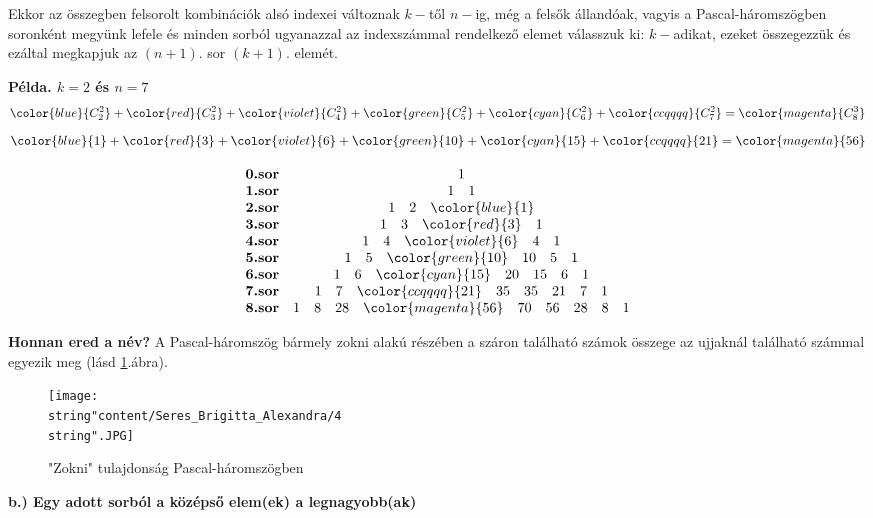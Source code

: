 Ekkor az összegben felsorolt kombinációk alsó indexei változnak $k-$től
$n-$ig, még a felsők \textcolor{ccqqqq}{állandóak}, vagyis a Pascal-háromszögben
soronként megyünk lefele és minden sorból ugyanazzal az indexszámmal
rendelkező elemet válasszuk ki: $k-$adikat, ezeket összegezzük és
ezáltal megkapjuk az $(n+1).$ sor $(k+1).$ elemét.

\textbf{Példa. $k=2$ és $n=7$} 
\[
{\color{blue}{C_{2}^{2}}}+{\color{red}{C_{3}^{2}}}+{\color{violet}{C_{4}^{2}}}+{\color{green}{C_{5}^{2}}}+{\color{cyan}{C_{6}^{2}}}+{\color{ccqqqq}{C_{7}^{2}}}={\color{magenta}{C_{8}^{3}}}
\]
\[
{\color{blue}{1}}+{\color{red}{3}}+{\color{violet}{6}}+{\color{green}{10}}+{\color{cyan}{15}}+{\color{ccqqqq}{21}}={\color{magenta}{56}}
\]

\[
\begin{array}{rc}
\textbf{0.sor} & 1\\
\textbf{1.sor} & 1\quad1\\
\textbf{2.sor} & 1\quad2\quad{\color{blue}{1}}\\
\textbf{3.sor} & 1\quad3\quad{\color{red}{3}}\quad1\\
\textbf{4.sor} & 1\quad4\quad{\color{violet}{6}}\quad4\quad1\\
\textbf{5.sor} & 1\quad5\quad{\color{green}{10}}\quad10\quad5\quad1\\
\textbf{6.sor} & 1\quad6\quad{\color{cyan}{15}}\quad20\quad15\quad6\quad1\\
\textbf{7.sor} & 1\quad7\quad{\color{ccqqqq}{21}}\quad35\quad35\quad21\quad7\quad1\\
\textbf{8.sor} & 1\quad8\quad28\quad{\color{magenta}{56}}\quad70\quad56\quad28\quad8\quad1
\end{array}
\]

\vspace{0.2cm}

\textbf{Honnan ered a név?} A Pascal-háromszög bármely zokni alakú
részében a száron található számok összege az ujjaknál található számmal
egyezik meg (lásd \ref{7sb3}.ábra). 
\begin{figure}[h]
\centering \texttt{[image: \\string"content/Seres\_Brigitta\_Alexandra/4\\string".JPG]}
\caption{"Zokni" tulajdonság Pascal-háromszögben}
\label{7sb3}
\end{figure}

\textbf{b.) Egy adott sorból a középső elem(ek) a legnagyobb(ak) \label{7sb6}}

